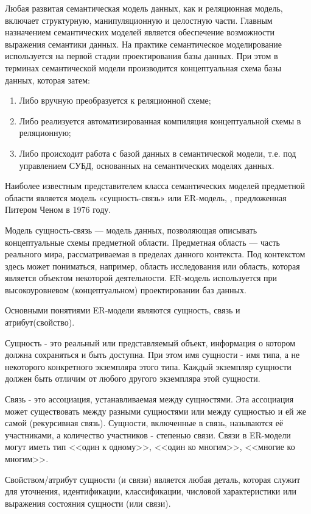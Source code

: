Любая развитая семантическая модель данных, как и реляционная модель, включает структурную, манипуляционную и целостную части. Главным назначением семантических моделей является обеспечение возможности выражения семантики данных. На практике семантическое моделирование используется на первой стадии проектирования базы данных. При этом в терминах семантической модели производится концептуальная схема базы данных, которая затем:
\begin{enumerate}
	\item Либо вручную преобразуется к реляционной схеме;
	\item Либо реализуется автоматизированная компиляция концептуальной схемы в реляционную;
	\item Либо происходит работа с базой данных в семантической модели, т.е. под управлением СУБД, основанных на семантических моделях данных. 
\end{enumerate}

Наиболее известным представителем класса семантических моделей предметной области является модель «сущность-связь» или ER-модель, , предложенная Питером Ченом в 1976 году.

Модель сущность-связь — модель данных, позволяющая описывать концептуальные схемы предметной области. Предметная область — часть реального мира, рассматриваемая в пределах данного контекста. Под контекстом здесь может пониматься, например, область исследования или область, которая является объектом некоторой деятельности. ER-модель используется при высокоуровневом (концептуальном) проектировании баз данных.

Основными понятиями ER-модели являются сущность, связь и атрибут(свойство).

Сущность - это реальный или представляемый объект, информация о котором должна сохраняться и быть доступна. При этом имя сущности - имя типа, а не некоторого конкретного экземпляра этого типа. Каждый экземпляр сущности должен быть отличим от любого другого экземпляра этой сущности.

Связь - это ассоциация, устанавливаемая между сущностями. Эта ассоциация может существовать между разными сущностями или между сущностью и ей же самой (рекурсивная связь). Сущности, включенные в связь, называются её участниками, а количество участников - степенью связи. Связи в ER-модели могут иметь тип <<один к одному>>, <<один ко многим>>, <<многие ко многим>>.

Свойством/атрибут сущности (и связи) является любая деталь, которая служит для уточнения, идентификации, классификации, числовой характеристики или выражения состояния сущности (или связи).

